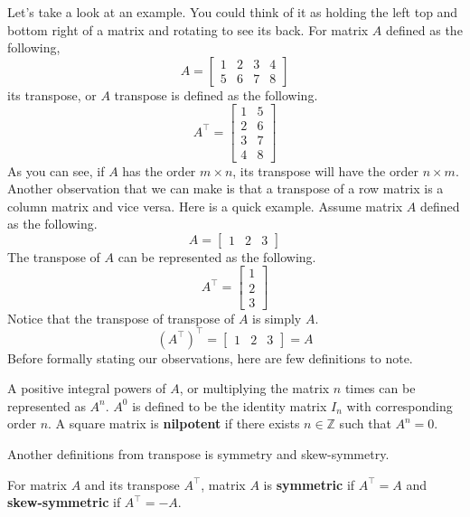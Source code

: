 \documentclass[../main.tex]{subfiles}
\begin{document}
Let's take a look at an example. You could think of it as holding
the left top and bottom right of a matrix and rotating to see its
back. For matrix $A$ defined as the following,
\[
A =
\begin{bmatrix}
    1 & 2 & 3 & 4 \\
    5 & 6 & 7 & 8
\end{bmatrix}
\]
its transpose, or $A$ transpose is defined as the following.
\[
A^\intercal =
\begin{bmatrix}
    1 & 5 \\
    2 & 6 \\
    3 & 7 \\
    4 & 8
\end{bmatrix}
\]
As you can see, if $A$ has the order $m \times n$, its transpose
will have the order $n \times m$. Another observation that we can
make is that a transpose of a row matrix is a column matrix and
vice versa. Here is a quick example. Assume matrix $A$ defined
as the following.
\[
A =
\begin{bmatrix}
    1 & 2 & 3
\end{bmatrix}
\]
The transpose of $A$ can be represented as the following.
\[
A^\intercal =
\begin{bmatrix}
    1 \\
    2 \\
    3
\end{bmatrix}
\]
Notice that the transpose of transpose of $A$ is simply $A$.
\[
(A^\intercal)^\intercal =
\begin{bmatrix}
    1 & 2 & 3
\end{bmatrix}
= A
\]
Before formally stating our observations, here are few definitions
to note.

\begin{definition}
A positive integral powers of $A$, or multiplying the matrix $n$
times can be represented as $A^n$. $A^0$ is defined to be the
identity matrix $I_n$ with corresponding order $n$. A square
matrix is \textbf{nilpotent} if there exists $n \in \mathbb{Z}$
such that $A^n = 0$.
\end{definition}

Another definitions from transpose is symmetry and skew-symmetry.

\begin{definition}
For matrix $A$ and its transpose $A^\intercal$, matrix $A$ is
\textbf{symmetric} if $A^\intercal = A$ and \textbf{skew-symmetric}
if $A^\intercal = -A$.
\end{definition}
\end{document}
